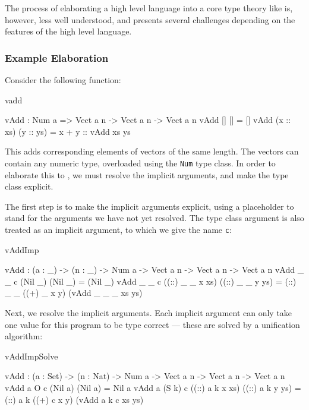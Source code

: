 The process of elaborating a high level language into a core type theory like \TT{} is,
however, less well understood, and presents several challenges depending on the
features of the high level language. 

\subsubsection{Example Elaboration}

Consider the following \Idris{} function:

\begin{SaveVerbatim}{vadd}

vAdd : Num a => Vect a n -> Vect a n -> Vect a n
vAdd []        []        = []
vAdd (x :: xs) (y :: ys) = x + y :: vAdd xs ys

\end{SaveVerbatim}

\noindent
This adds corresponding elements of vectors of the same length. The vectors can contain
any numeric type, overloaded using the \texttt{Num} type class. In order to elaborate
this to \TT{}, we must resolve the implicit arguments, and make the type class explicit.

The first step is to make the implicit arguments explicit, using a placeholder
to stand for the arguments we have not yet resolved. The type class argument is
also treated as an implicit argument, to which we give the name \texttt{c}:

\begin{SaveVerbatim}{vAddImp}

vAdd : (a : _) -> (n : _) -> Num a -> Vect a n -> Vect a n -> Vect a n
vAdd _ _ c (Nil _)         (Nil _)         = (Nil _)
vAdd _ _ c ((::) _ _ x xs) ((::) _ _ y ys) 
                = (::) _ _ ((+) _ x y) (vAdd _ _ _ xs ys)

\end{SaveVerbatim}

Next, we resolve the implicit arguments. Each implicit argument can only take
one value for this program to be type correct --- these are solved by a unification
algorithm:

\begin{SaveVerbatim}{vAddImpSolve}

vAdd : (a : Set) -> (n : Nat) -> Num a -> Vect a n -> Vect a n -> Vect a n
vAdd a O     c (Nil a)         (Nil a)         = Nil a
vAdd a (S k) c ((::) a k x xs) ((::) a k y ys) 
                = (::) a k ((+) c x y) (vAdd a k c xs ys)

\end{SaveVerbatim}

